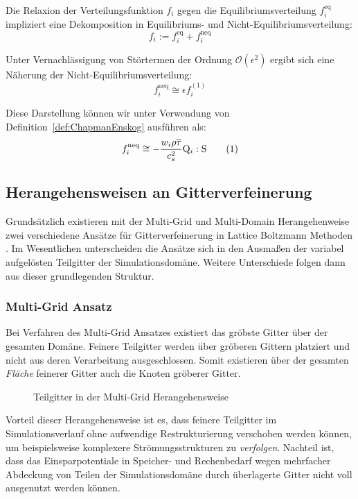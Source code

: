 \begin{Definition}
Die Relaxion der Verteilungsfunktion \(f_i\) gegen die Equilibriumsverteilung \(f_i^\text{eq}\) impliziert eine Dekomposition in Equilibriums- und Nicht-Equilibriumsverteilung: \[f_i := f_i^\text{eq} + f_i^\text{neq}\]
\end{Definition}

Unter Vernachlässigung von Störtermen der Ordnung \(\mathcal{O}(\epsilon^2)\) ergibt sich eine Näherung der Nicht-Equilibriumsverteilung:
\[f_i^\text{neq} \cong \epsilon f_i^{(1)}\]

Diese Darstellung können wir unter Verwendung von Definition~\ref{def:ChapmanEnskog} ausführen als:
\[f_i^\text{neq} \cong -\frac{w_i \rho \overline\tau}{c_s^2} \mathrm{Q}_i : \mathrm{S} \numberthis\label{eq:approxFneq}\]

\newpage
\subsection{Herangehensweisen an Gitterverfeinerung}

Grundsätzlich existieren mit der Multi-Grid und Multi-Domain Herangehenweise zwei verschiedene Ansätze für Gitterverfeinerung in Lattice Boltzmann Methoden \cite[Kap.~3.1]{Lagrava12}. Im Wesentlichen unterscheiden die Ansätze sich in den Ausmaßen der variabel aufgelösten Teilgitter der Simulationsdomäne. Weitere Unterschiede folgen dann aus dieser grundlegenden Struktur.

\subsubsection{Multi-Grid Ansatz}

Bei Verfahren des Multi-Grid Ansatzes existiert das gröbste Gitter über der gesamten Domäne. Feinere Teilgitter werden über gröberen Gittern platziert und nicht aus deren Verarbeitung ausgeschlossen. Somit existieren über der gesamten \emph{Fläche} feinerer Gitter auch die Knoten gröberer Gitter.

\begin{figure}[h]
\centering

\caption{Teilgitter in der Multi-Grid Herangehensweise}
\end{figure}

Vorteil dieser Herangehensweise ist es, dass feinere Teilgitter im Simulationsverlauf ohne aufwendige Restrukturierung verschoben werden können, um beispielsweise komplexere Strömungsstrukturen zu \emph{verfolgen}. Nachteil ist, dass das Einsparpotentiale in Speicher- und Rechenbedarf wegen mehrfacher Abdeckung von Teilen der Simulationsdomäne durch überlagerte Gitter nicht voll ausgenutzt werden können.

